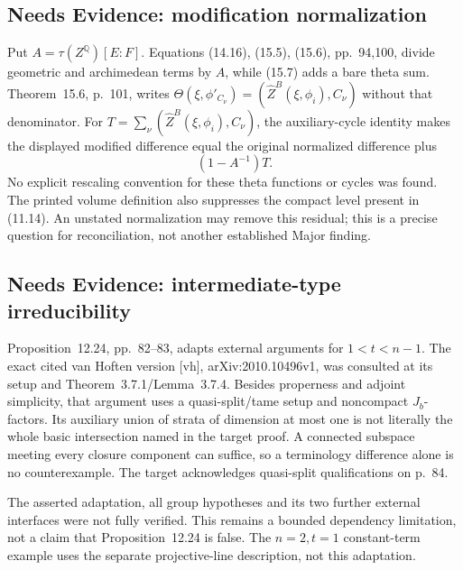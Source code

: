 \documentclass[10pt]{article}
\begin{document}
\subsection*{Needs Evidence: modification normalization}
Put \(A=\tau(Z^{\mathbb Q})[E:F]\). Equations (14.16), (15.5), (15.6), pp. 94,100, divide geometric and archimedean terms by \(A\), while (15.7) adds a bare theta sum. Theorem 15.6, p. 101, writes \(\Theta(\xi,\phi'_{C_\nu})=(\widehat Z^B(\xi,\phi_i),C_\nu)\) without that denominator. For \(T=\sum_\nu(\widehat Z^B(\xi,\phi_i),C_\nu)\), the auxiliary-cycle identity makes the displayed modified difference equal the original normalized difference plus \[(1-A^{-1})T.\] No explicit rescaling convention for these theta functions or cycles was found. The printed volume definition also suppresses the compact level present in (11.14). An unstated normalization may remove this residual; this is a precise question for reconciliation, not another established Major finding.\par
\subsection*{Needs Evidence: intermediate-type irreducibility}
Proposition 12.24, pp. 82–83, adapts external arguments for \(1<t<n-1\). The exact cited van Hoften version [vh], arXiv:2010.10496v1, was consulted at its setup and Theorem 3.7.1/Lemma 3.7.4. Besides properness and adjoint simplicity, that argument uses a quasi-split/tame setup and noncompact \(J_b\)-factors. Its auxiliary union of strata of dimension at most one is not literally the whole basic intersection named in the target proof. A connected subspace meeting every closure component can suffice, so a terminology difference alone is no counterexample. The target acknowledges quasi-split qualifications on p. 84.\par
The asserted adaptation, all group hypotheses and its two further external interfaces were not fully verified. This remains a bounded dependency limitation, not a claim that Proposition 12.24 is false. The \(n=2,t=1\) constant-term example uses the separate projective-line description, not this adaptation.\par
\end{document}
